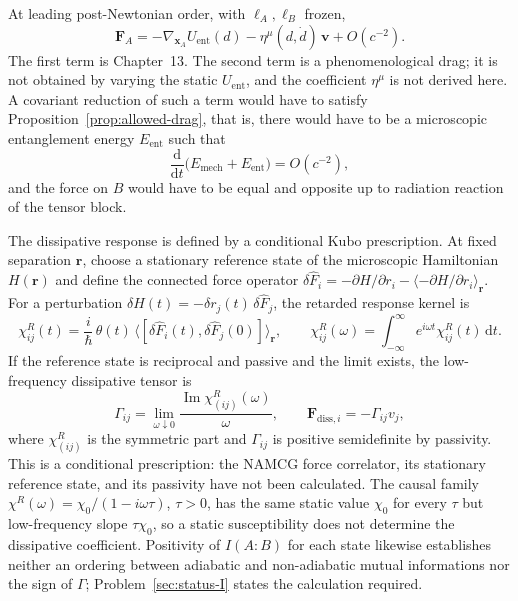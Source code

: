 At leading post-Newtonian order, with \(\ell_A,\ell_B\) frozen,
\begin{equation}
  \label{eq:force-PN}
  \mathbf{F}_A
  =-\nabla_{\mathbf{x}_A}U_{\mathrm{ent}}(d)
   -\eta^{\mu}(d,\dot d)\,\mathbf{v}
   +O(c^{-2}).
\end{equation}
The first term is Chapter~13. The second term is a phenomenological
drag; it is not obtained by varying the static \(U_{\mathrm{ent}}\),
and the coefficient \(\eta^{\mu}\) is not derived here.
A covariant reduction of such a term would have to satisfy
Proposition~\ref{prop:allowed-drag}, that is, there would have to be
a microscopic entanglement energy \(E_{\mathrm{ent}}\) such that
\begin{equation}
  \label{eq:balance-again}
  \frac{\mathrm{d}}{\mathrm{d}t}
  \bigl(E_{\mathrm{mech}}+E_{\mathrm{ent}}\bigr)
  =O(c^{-2}),
\end{equation}
and the force on \(B\) would have to be equal and opposite up to
radiation reaction of the tensor block.

The dissipative response is defined by a conditional Kubo
prescription. At fixed separation \(\mathbf r\), choose a stationary
reference state of the microscopic Hamiltonian \(H(\mathbf r)\) and
define the connected force operator
\(\delta\hat F_i=-\partial H/\partial r_i
-\langle-\partial H/\partial r_i\rangle_{\mathbf r}\). For a
perturbation \(\delta H(t)=-\delta r_j(t)\,\delta\hat F_j\), the
retarded response kernel is
\begin{equation}
  \label{eq:linear-response}
  \chi^R_{ij}(t)
  =\frac{i}{\hbar}\,\theta(t)\,
   \bigl\langle[\delta\hat F_i(t),\delta\hat F_j(0)]\bigr\rangle_{\mathbf r},
  \qquad
  \chi^R_{ij}(\omega)=\int_{-\infty}^{\infty}e^{i\omega t}
  \chi^R_{ij}(t)\,\mathrm{d}t.
\end{equation}
If the reference state is reciprocal and passive and the limit
exists, the low-frequency dissipative tensor is
\begin{equation}
  \label{eq:Gamma-kubo}
  \Gamma_{ij}
  =\lim_{\omega\downarrow0}
   \frac{\operatorname{Im}\chi^R_{(ij)}(\omega)}{\omega},
  \qquad
  \mathbf{F}_{\mathrm{diss},i}=-\Gamma_{ij}v_j,
\end{equation}
where \(\chi^R_{(ij)}\) is the symmetric part and \(\Gamma_{ij}\) is
positive semidefinite by passivity. This is a conditional
prescription: the NAMCG force correlator, its stationary reference
state, and its passivity have not been calculated.
The causal family \(\chi^R(\omega)=\chi_0/(1-i\omega\tau)\),
\(\tau>0\), has the same static value \(\chi_0\) for every
\(\tau\) but low-frequency slope \(\tau\chi_0\), so a static
susceptibility does not determine the dissipative coefficient.
Positivity of \(I(A:B)\) for each state likewise establishes neither
an ordering between adiabatic and non-adiabatic mutual informations
nor the sign of \(\Gamma\); Problem~\ref{sec:status-I} states the
calculation required.

